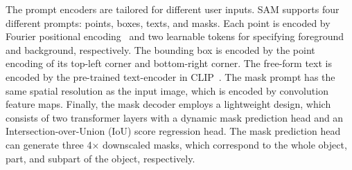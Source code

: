 \documentclass[runningheads]{llncs}
\begin{document}
The prompt encoders are tailored for different user inputs. SAM supports four different prompts: points, boxes, texts, and masks. Each point is encoded by Fourier positional encoding~\cite{FourierPE-Nips20} and two learnable tokens for specifying foreground and background, respectively. The bounding box is encoded by the point encoding of its top-left corner and bottom-right corner. The free-form text is encoded by the pre-trained text-encoder in CLIP~\cite{CLIP-ICML2021}. The mask prompt has the same spatial resolution as the input image, which is encoded by convolution feature maps. 
Finally, the mask decoder employs a lightweight design, which consists of two transformer layers with a dynamic mask prediction head and an Intersection-over-Union (IoU) score regression head. The mask prediction head can generate three 4$\times$ downscaled masks, which correspond to the whole object, part, and subpart of the object, respectively.
\end{document}
